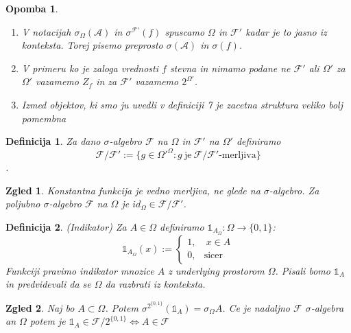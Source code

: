 \documentclass[a4paper,12pt]{article}
\newtheorem{definicija}{Definicija}
\newtheorem{zgled}{Zgled}
\newtheorem{opomba}{Opomba}
\newcommand{\F}{\mathcal{F}}
\newcommand{\A}{\mathcal{A}}
\begin{document}
            \begin{opomba}
                \begin{enumerate}
                    \item V notacijah $\sigma_\Omega(\A)$ in $\sigma^{\F'}(f)$ spuscamo $\Omega$ in $\F'$ kadar je to jasno iz konteksta. Torej pisemo preprosto $\sigma(\A)$ in $\sigma(f)$.
                    \item V primeru ko je zaloga vrednosti $f$ stevna in nimamo podane ne $\F'$ ali $\Omega'$ za $\Omega'$ vazamemo $Z_f$ in za $\F'$ vazamemo $2^{\Omega'}$.
                    \item Izmed objektov, ki smo ju uvedli v definiciji 7 je zacetna struktura veliko bolj pomembna
                \end{enumerate}
            \end{opomba}

            \begin{definicija}
                Za dano $\sigma$-algebro $\F$ na $\Omega$ in $\F'$ na $\Omega'$ definiramo $$\F/\F':= \{g \in \Omega'^\Omega: g \ \text{je} \ \F/\F'\text{-merljiva}\}$$.
            \end{definicija}

            \begin{zgled}
                Konstantna funkcija je vedno merljiva, ne glede na $\sigma$-algebro. Za poljubno $\sigma$-algebro $\F$ na $\Omega$ je $id_\Omega \in \F/\F'$.
            \end{zgled}

            \begin{definicija}(Indikator)
                Za $A \in \Omega$ definiramo $\mathds{1}_{A_\Omega}:\Omega\rightarrow\{0, 1\}$:
                $$\mathds{1}_{A_\Omega}(x) := 
                    \begin{cases}
                        1, & \ x \in A \\
                        0, & \text{sicer}
                    \end{cases}$$
                Funkciji pravimo indikator mnozice $A$ z underlying prostorom $\Omega$. Pisali bomo $\mathds{1}_A$ in predvidevali da se $\Omega$ da razbrati iz konteksta.
            \end{definicija}

            \begin{zgled}
                Naj bo $A \subset \Omega$. Potem $\sigma^{2^{\{0, 1\}}}(\mathds{1}_A) = \sigma_\Omega A$. Ce je nadaljno $\F$ $\sigma$-algebra an $\Omega$ potem je  $\mathds{1}_A \in \F/2^{\{0, 1\}} \iff A \in \F$ 
            \end{zgled}
\end{document}
